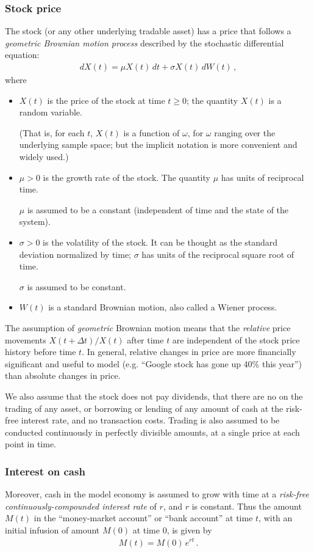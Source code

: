 \documentclass[12pt]{article}
\begin{document}
\subsubsection{Stock price}
The stock 
(or any other underlying tradable asset)
has a price that follows a \emph{geometric Brownian motion
process} described by the stochastic differential equation:
\begin{align}\label{eq:stock}
d X(t) = \mu X(t) \, dt + \sigma X(t) \, dW(t)\,,
\end{align}
where
\begin{itemize}
\item
$X(t)$ is the price of the stock at time $t \geq 0$; the quantity $X(t)$ is
a random variable. 

(That is, for each $t$, $X(t)$ is a function of $\omega$,
for $\omega$ ranging over the underlying sample space; but the implicit
notation is more convenient and widely used.)
\item
$\mu > 0$ is the growth rate of the stock.  The quantity $\mu$ has units
of reciprocal time.  

$\mu$ is assumed to be a constant (independent of time and the state
of the system).
\item
$\sigma > 0$ is the volatility of the stock.
It can be thought as the standard deviation normalized by time;
$\sigma$ has units of the reciprocal square root of time.

$\sigma$ is assumed to be constant.
\item
$W(t)$ is a standard Brownian motion, also called a Wiener process.
\end{itemize}

The assumption of \emph{geometric} Brownian motion means
that the \emph{relative} price movements $X(t + \Delta t)/X(t)$
after time $t$
are independent of the stock price history before time $t$.
In general,
 relative changes in price 
are more financially significant and useful to model
(e.g. ``Google stock has gone up 40\% this year'')
than absolute changes in price.

We also assume that the stock does not pay dividends,
that there are no  on the trading of any asset,
or borrowing or lending of any amount of cash at the risk-free interest rate, 
and no transaction costs.
Trading is also assumed to be conducted continuously
in perfectly divisible amounts,
at a single price at each point in time.

\subsubsection{Interest on cash}

Moreover, cash in the model economy is assumed to grow
with time at a \emph{risk-free continuously-compounded interest rate} of $r$,
and $r$ is constant.  Thus the amount $M(t)$ in the ``money-market account''
or ``bank account''
at time $t$,
with an initial infusion of amount $M(0)$ at time $0$,
is given by
\begin{align*}
M(t) = M(0) \, e^{rt}\,.
\end{align*}


\end{document}
